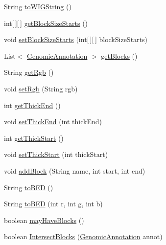 \begin{DoxyCompactItemize}
\item 
String \hyperlink{classbroad_1_1core_1_1annotation_1_1_b_e_d_ac55b3533d091bdaacce66cb51a47b8c0}{to\+W\+I\+G\+String} ()
\item 
int\mbox{[}$\,$\mbox{]}\mbox{[}$\,$\mbox{]} \hyperlink{classbroad_1_1core_1_1annotation_1_1_b_e_d_ac211b2014e51647c781e3556d072df57}{get\+Block\+Size\+Starts} ()
\item 
void \hyperlink{classbroad_1_1core_1_1annotation_1_1_b_e_d_a0b29ae94ceab37657208e52401e6c146}{set\+Block\+Size\+Starts} (int\mbox{[}$\,$\mbox{]}\mbox{[}$\,$\mbox{]} block\+Size\+Starts)
\item 
List$<$ \hyperlink{interfacebroad_1_1core_1_1annotation_1_1_genomic_annotation}{Genomic\+Annotation} $>$ \hyperlink{classbroad_1_1core_1_1annotation_1_1_b_e_d_a695ef7ec4841b35e0b5decd4c3fa1e79}{get\+Blocks} ()
\item 
String \hyperlink{classbroad_1_1core_1_1annotation_1_1_b_e_d_ac4731b050a7b8a172795a285d655f1c0}{get\+Rgb} ()
\item 
void \hyperlink{classbroad_1_1core_1_1annotation_1_1_b_e_d_ae640c0e44d7bece6468367b1f0d939c4}{set\+Rgb} (String rgb)
\item 
int \hyperlink{classbroad_1_1core_1_1annotation_1_1_b_e_d_a536117fb2a3bfc5dd57afd96c783e04d}{get\+Thick\+End} ()
\item 
void \hyperlink{classbroad_1_1core_1_1annotation_1_1_b_e_d_a84b56939d50e48221c25bee0ce905a1d}{set\+Thick\+End} (int thick\+End)
\item 
int \hyperlink{classbroad_1_1core_1_1annotation_1_1_b_e_d_a1d5ccf3b546f5dd4fdc96c31fb0e599c}{get\+Thick\+Start} ()
\item 
void \hyperlink{classbroad_1_1core_1_1annotation_1_1_b_e_d_ab50226189f71ccd48f52e5a78143a3e7}{set\+Thick\+Start} (int thick\+Start)
\item 
void \hyperlink{classbroad_1_1core_1_1annotation_1_1_b_e_d_a93232cebb0a54bf0ad8c43dc8b6e8e95}{add\+Block} (String name, int start, int end)
\item 
String \hyperlink{classbroad_1_1core_1_1annotation_1_1_b_e_d_acfdb096276e1fcbc72d283817abeb012}{to\+B\+E\+D} ()
\item 
String \hyperlink{classbroad_1_1core_1_1annotation_1_1_b_e_d_acf8673ace0b95319a72e7bf115d80f5b}{to\+B\+E\+D} (int r, int g, int b)
\item 
boolean \hyperlink{classbroad_1_1core_1_1annotation_1_1_b_e_d_a95513f9450e6d7d79d9803d1fb0a8762}{may\+Have\+Blocks} ()
\item 
boolean \hyperlink{classbroad_1_1core_1_1annotation_1_1_b_e_d_a300061669e13aa1072380dd85d1c5796}{Intersect\+Blocks} (\hyperlink{interfacebroad_1_1core_1_1annotation_1_1_genomic_annotation}{Genomic\+Annotation} annot)
\end{DoxyCompactItemize}
